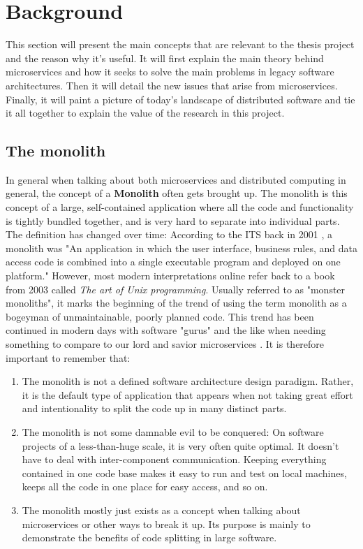 \chapter{Background}

\label{Chapter2}

This section will present the main concepts that are relevant to the thesis project and the reason why it's useful.
It will first explain the main theory behind microservices and how it seeks to solve the main problems in legacy software architectures. Then it will
detail the new issues that arise from microservices. Finally, it will paint a picture of today's landscape of distributed software and
tie it all together to explain the value of the research in this project.

\section{The monolith}
In general when talking about both microservices and distributed computing in general, the concept of a \textbf{Monolith} often gets brought up.
The monolith is this concept of a large, self-contained application where all the code and functionality is tightly bundled together, and is very hard to separate into individual parts.
The definition has changed over time: According to the ITS back in 2001 \cite{ITS}, a monolith was "An application in which the user interface, business rules, and data access code is combined into a single executable program and deployed on one platform."
However, most modern interpretations online refer back to a book from 2003 called \textit{The art of Unix programming}. Usually referred to as "monster monoliths", it marks the beginning of the trend of using the term monolith as a bogeyman of unmaintainable, poorly planned code.
This trend has been continued in modern days with software "gurus" and the like when needing something to compare to our lord and savior microservices \cite*{Gouigoux2017}.
It is therefore important to remember that:
\begin{enumerate}
    \item The monolith is not a defined software architecture design paradigm. Rather, it is the default type of application that appears when not taking great effort and intentionality to split the code up in many distinct parts.
    \item The monolith is not some damnable evil to be conquered: On software projects of a less-than-huge scale, it is very often quite optimal. It doesn't have to deal with inter-component communication. Keeping everything contained in one code base makes it easy to run and test on local machines, keeps all the code in one place for easy access, and so on.
    \item The monolith mostly just exists as a concept when talking about microservices or other ways to break it up. Its purpose is mainly to demonstrate the benefits of code splitting in large software.
\end{enumerate}

